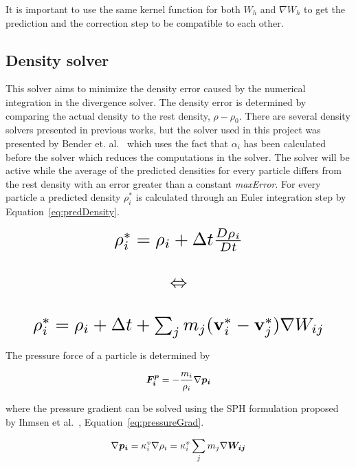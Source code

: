     It is important to use the same kernel function for both $W_h$ and $\nabla W_h$ to get the prediction and the correction step to be compatible to each other.

\subsection{Density solver} \label{densitySolver}
    This solver aims to minimize the density error caused by the numerical integration in the divergence solver. The density error is determined by comparing the actual density to the rest density, $\rho - \rho_0$. There are several density solvers presented in previous works, but the solver used in this project was presented by Bender et. al.~\cite{bender} which uses the fact that $\alpha_i$ has been calculated before the solver which reduces the computations in the solver. The solver will be active while the average of the predicted densities for every particle differs from the rest density with an error greater than a constant \textit{maxError}. For every particle a predicted density $\rho_i^*$ is calculated through an Euler integration step by Equation~\ref{eq:predDensity}.

    \begin{equation} \label{eq:predDensity}
        \resizebox{0.88\linewidth}{!}{$
        \begin{matrix}
        \rho_i^* = \rho_i + \Delta t \frac{D\rho_i}{Dt} \\ 
        \\
        \Leftrightarrow \\ 
        \\
        \rho_i^* = \rho_i + \Delta t + \sum_j m_j 
        (\textbf{v}_i^* - \textbf{v}_j^*) \nabla W_{ij}
        \end{matrix}
        $}
    \end{equation}

    The pressure force of a particle is determined by 

    \begin{equation} \label{eq:pressure}
        \bm{F_i^p} = -\frac{m_i}{\rho_i}\nabla \bm{p_i}
    \end{equation}

    where the pressure gradient can be solved using the SPH formulation proposed by Ihmsen et al.~\cite{ihmsen}, Equation~\ref{eq:pressureGrad}.

    \begin{equation} \label{eq:pressureGrad}
        \nabla \bm{p_i} = \kappa_i^v \nabla \rho_i = \kappa_i^v \sum_j m_j \nabla \bm{W_{ij}}
    \end{equation}

